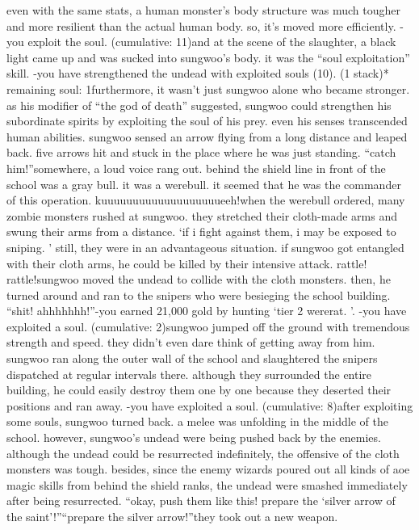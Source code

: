 even with the same stats, a human monster’s body structure was much tougher and more resilient than the actual human body.
 so, it’s moved more efficiently.
-you exploit the soul.
 (cumulative: 11)and at the scene of the slaughter, a black light came up and was sucked into sungwoo’s body.
it was the “soul exploitation” skill.
-you have strengthened the undead with exploited souls (10).
 (1 stack)* remaining soul: 1furthermore, it wasn’t just sungwoo alone who became stronger.
 as his modifier of “the god of death” suggested, sungwoo could strengthen his subordinate spirits by exploiting the soul of his prey.
 even his senses transcended human abilities.
 sungwoo sensed an arrow flying from a long distance and leaped back.
 five arrows hit and stuck in the place where he was just standing.
“catch him!”somewhere, a loud voice rang out.
 behind the shield line in front of the school was a gray bull.
it was a werebull.
 it seemed that he was the commander of this operation.
kuuuuuuuuuuuuuuuuuuueeh!when the werebull ordered, many zombie monsters rushed at sungwoo.
 they stretched their cloth-made arms and swung their arms from a distance.
‘if i fight against them, i may be exposed to sniping.
’
still, they were in an advantageous situation.
 if sungwoo got entangled with their cloth arms, he could be killed by their intensive attack.
rattle! rattle!sungwoo moved the undead to collide with the cloth monsters.
 then, he turned around and ran to the snipers who were besieging the school building.
“shit! ahhhhhhh!”-you earned 21,000 gold by hunting ‘tier 2 wererat.
’.
-you have exploited a soul.
 (cumulative: 2)sungwoo jumped off the ground with tremendous strength and speed.
 they didn’t even dare think of getting away from him.
sungwoo ran along the outer wall of the school and slaughtered the snipers dispatched at regular intervals there.
 although they surrounded the entire building, he could easily destroy them one by one because they deserted their positions and ran away.
-you have exploited a soul.
 (cumulative: 8)after exploiting some souls, sungwoo turned back.
a melee was unfolding in the middle of the school.
 however, sungwoo’s undead were being pushed back by the enemies.
although the undead could be resurrected indefinitely, the offensive of the cloth monsters was tough.
 besides, since the enemy wizards poured out all kinds of aoe magic skills from behind the shield ranks, the undead were smashed immediately after being resurrected.
“okay, push them like this! prepare the ‘silver arrow of the saint’!”“prepare the silver arrow!”they took out a new weapon.
